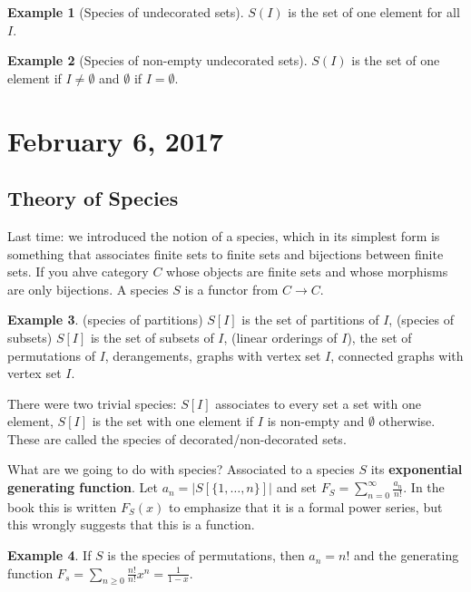 \documentclass[12pt]{article}
\theoremstyle{definition}
\newtheorem{exmp}{Example}[section]
\begin{document}
\begin{exmp}[Species of undecorated sets]
    $S(I)$ is the set of one element for all $I$. 
\end{exmp}

\begin{exmp}[Species of non-empty undecorated sets]
    $S(I)$ is the set of one element if $I \ne \emptyset$ and $\emptyset$ if $I
    = \emptyset$.
\end{exmp}

\section{February 6, 2017}

\subsection{Theory of Species}

Last time: we introduced the notion of a species, which in its simplest form is
something that associates finite sets to finite sets and bijections between
finite sets. If you ahve category $C$ whose objects are finite sets and whose
morphisms are only bijections. A species $S$ is a functor from $C \rightarrow
C$.

\begin{exmp}
    (species of partitions) $S[I]$ is the set of partitions of $I$, (species of
    subsets) $S[I]$ is the set of subsets of $I$, (linear orderings of $I$),
    the set of permutations of $I$, derangements, graphs with vertex set $I$,
    connected graphs with vertex set $I$.
\end{exmp}

There were two trivial species: $S[I]$ associates to every set a set with one
element, $S[I]$ is the set with one element if $I$ is non-empty and $\emptyset$
otherwise. These are called the species of decorated/non-decorated sets.

What are we going to do with species? Associated to a species $S$ its
\textbf{exponential generating function}. Let $a_n = |S[\{1, \ldots, n\}]|$ and
set $F_S = \sum_{n = 0}^\infty \frac{a_n}{n!}$. In the book this is written
$F_S(x)$ to emphasize that it is a formal power series, but this wrongly
suggests that this is a function.

\begin{exmp}
    If $S$ is the species of permutations, then $a_n = n!$ and the generating
    function $F_s = \sum_{n \ge 0} \frac{n!}{n!} x^n = \frac{1}{1-x}$.
\end{exmp}
\end{document}
